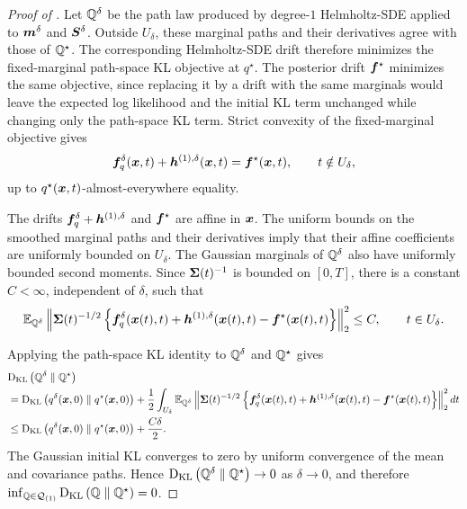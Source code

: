 \begin{proof}[Proof of ]
Let $\mathbb{Q}^\delta$ be the path law produced by degree-$1$ Helmholtz-SDE applied to $\boldsymbol{m}^\delta$ and $\boldsymbol{S}^\delta$.
Outside $U_\delta$, these marginal paths and their derivatives agree with those of $\mathbb{Q}^\star$.
The corresponding Helmholtz-SDE drift therefore minimizes the fixed-marginal path-space KL objective at $q^\star$.
The posterior drift $\boldsymbol{f}^\star$ minimizes the same objective, since replacing it by a drift with the same marginals would leave the expected log likelihood and the initial KL term unchanged while changing only the path-space KL term.
Strict convexity of the fixed-marginal objective gives
\begin{equation*}
\boldsymbol{f}_q^\delta(\boldsymbol{x},t)+\boldsymbol{h}^{(1),\delta}(\boldsymbol{x},t)=\boldsymbol{f}^\star(\boldsymbol{x},t), \qquad t\notin U_\delta,
\end{equation*}
up to $q^\star(\boldsymbol{x},t)$-almost-everywhere equality.

The drifts $\boldsymbol{f}_q^\delta + \boldsymbol{h}^{(1),\delta}$ and $\boldsymbol{f}^\star$ are affine in $\boldsymbol{x}$.
The uniform bounds on the smoothed marginal paths and their derivatives imply that their affine coefficients are uniformly bounded on $U_\delta$.
The Gaussian marginals of $\mathbb{Q}^\delta$ also have uniformly bounded second moments.
Since $\boldsymbol{\Sigma}(t)^{-1}$ is bounded on $[0,T]$, there is a constant $C<\infty$, independent of $\delta$, such that
\begin{equation*}
\mathbb{E}_{\mathbb{Q}^\delta}\left\|\boldsymbol{\Sigma}(t)^{-1/2}\left\{\boldsymbol{f}_q^\delta(\boldsymbol{x}(t),t)+\boldsymbol{h}^{(1),\delta}(\boldsymbol{x}(t),t)-\boldsymbol{f}^\star(\boldsymbol{x}(t),t)\right\}\right\|_2^2\leq C, \qquad t\in U_\delta.
\end{equation*}

Applying the path-space KL identity to $\mathbb{Q}^\delta$ and $\mathbb{Q}^\star$ gives
{\small
\begin{equation*}
\begin{aligned}
&\textrm{D}_{\textrm{KL}}\left(\mathbb{Q}^\delta\;\|\;\mathbb{Q}^\star\right)\\
&=\textrm{D}_{\textrm{KL}}\left(q^\delta(\boldsymbol{x},0)\;\|\;q^\star(\boldsymbol{x},0)\right)+\frac{1}{2}\int_{U_\delta}\mathbb{E}_{\mathbb{Q}^\delta}\left\|\boldsymbol{\Sigma}(t)^{-1/2}\left\{\boldsymbol{f}_q^\delta(\boldsymbol{x}(t),t)+\boldsymbol{h}^{(1),\delta}(\boldsymbol{x}(t),t)-\boldsymbol{f}^\star(\boldsymbol{x}(t),t)\right\}\right\|_2^2dt\\
&\leq\textrm{D}_{\textrm{KL}}\left(q^\delta(\boldsymbol{x},0)\;\|\;q^\star(\boldsymbol{x},0)\right)+\frac{C\delta}{2}.
\end{aligned}
\end{equation*}
}
The Gaussian initial KL converges to zero by uniform convergence of the mean and covariance paths.
Hence $\textrm{D}_{\textrm{KL}}\left(\mathbb{Q}^\delta\;\|\;\mathbb{Q}^\star\right)\to0$ as $\delta\to0$, and therefore $\inf_{\mathbb{Q}\in\mathcal{Q}_{(1)}}\textrm{D}_{\textrm{KL}}\left(\mathbb{Q}\;\|\;\mathbb{Q}^\star\right)=0$.
\end{proof}

